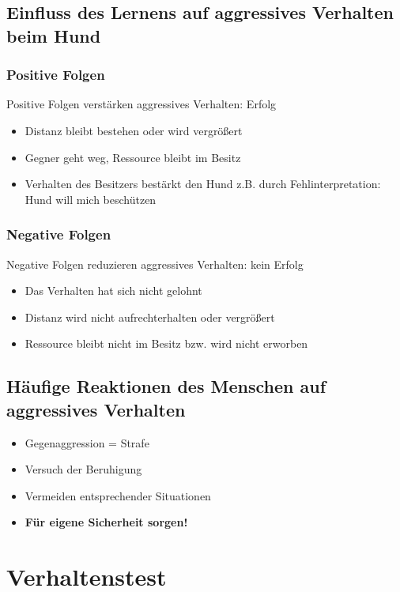     \subsection{Einfluss des Lernens auf aggressives Verhalten beim Hund}
        \subsubsection{Positive Folgen}
            Positive Folgen verstärken aggressives Verhalten: Erfolg
            \begin{itemize}
                \item Distanz bleibt bestehen oder wird vergrößert
                \item Gegner geht weg, Ressource bleibt im Besitz
                \item Verhalten des Besitzers bestärkt den Hund z.B. durch Fehlinterpretation: \glqq Hund will mich beschützen\grqq
            \end{itemize}
        \subsubsection{Negative Folgen}
            Negative Folgen reduzieren aggressives Verhalten: kein Erfolg
            \begin{itemize}
                \item Das Verhalten hat sich nicht gelohnt
                \item Distanz wird nicht aufrechterhalten oder vergrößert
                \item Ressource bleibt nicht im Besitz bzw. wird nicht erworben
            \end{itemize}

    \subsection{Häufige Reaktionen des Menschen auf aggressives Verhalten}
        \begin{itemize}
            \item Gegenaggression = Strafe
            \item Versuch der \glqq Beruhigung\grqq
            \item Vermeiden entsprechender Situationen
            \item \textbf{Für eigene Sicherheit sorgen!}
        \end{itemize}

\section{Verhaltenstest}
